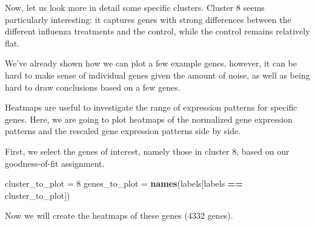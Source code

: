 \documentclass[9pt,a4paper,]{extarticle}
\newenvironment{Shaded}{\begin{snugshade}}{\end{snugshade}}
\newcommand{\DecValTok}[1]{\textcolor[rgb]{0.00,0.00,0.81}{#1}}
\newcommand{\KeywordTok}[1]{\textcolor[rgb]{0.13,0.29,0.53}{\textbf{#1}}}
\newcommand{\NormalTok}[1]{#1}
\newcommand{\OperatorTok}[1]{\textcolor[rgb]{0.81,0.36,0.00}{\textbf{#1}}}
\newcommand{\StringTok}[1]{\textcolor[rgb]{0.31,0.60,0.02}{#1}}
\begin{document}
Now, let us look more in detail some specific clusters. Cluster 8 seems
particularly interesting: it captures genes with strong differences between
the different influenza treatments and the control, while the control remains
relatively flat.

We've already shown how we can plot a few example genes, however, it can be
hard to make sense of individual genes given the amount of noise, as well as
being hard to draw conclusions based on a few genes.

Heatmaps are useful to investigate the range of expression patterns for
specific genes. Here, we are going to plot heatmaps of the normalized gene
expression patterns and the rescaled gene expression patterns side by side.

First, we select the genes of interest, namely those in cluster 8, based on
our goodness-of-fit assignment.

\begin{Shaded}
\begin{Highlighting}[]
\NormalTok{cluster_to_plot =}\StringTok{ }\DecValTok{8}
\NormalTok{genes_to_plot =}\StringTok{  }\KeywordTok{names}\NormalTok{(labels[labels }\OperatorTok{==}\StringTok{ }\NormalTok{cluster_to_plot])}
\end{Highlighting}
\end{Shaded}

Now we will create the heatmaps of these genes (4332 genes).
\end{document}
